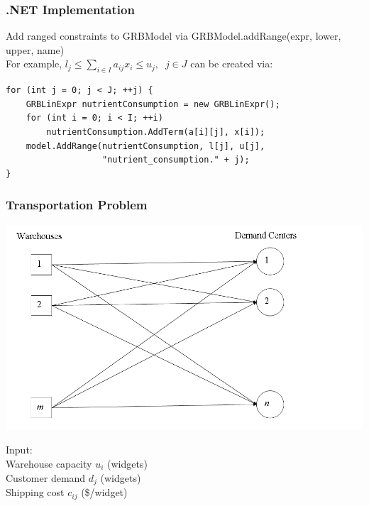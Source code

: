 \documentclass[12pt,handout]{beamer}
\begin{document}
\begin{frame} [containsverbatim]
\frametitle{.NET Implementation}
Add ranged constraints to GRBModel via GRBModel.addRange(expr, lower, upper, name) \\
For example, $l_j \le \sum_{i \in I} a_{ij} x_i \le u_j,\;\;j \in J$ can be created via: \\
\small
\begin{verbatim}
for (int j = 0; j < J; ++j) {
    GRBLinExpr nutrientConsumption = new GRBLinExpr();
    for (int i = 0; i < I; ++i)
        nutrientConsumption.AddTerm(a[i][j], x[i]);
    model.AddRange(nutrientConsumption, l[j], u[j],
                   "nutrient_consumption." + j);
}
\end{verbatim}
\end{frame}

\begin{frame}
\frametitle{Transportation Problem}
\begin{center}
\includegraphics[scale = 0.3]{transportation_problem.png}
\end{center}
Input: \\
Warehouse capacity $u_i$ (widgets) \\
Customer demand $d_j$ (widgets) \\
Shipping cost $c_{ij}$ (\$/widget)
\end{frame}
\end{document}
